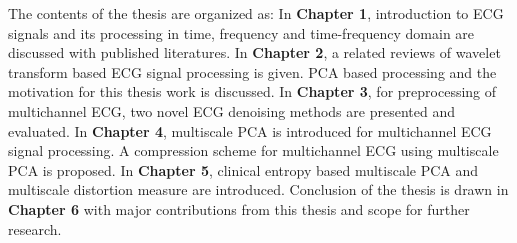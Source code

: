 \noindent The contents of the thesis are organized as: In
\textbf{Chapter 1}, introduction to ECG signals and its processing
in time, frequency and time-frequency domain are discussed with
published literatures. In \textbf{Chapter 2}, a related reviews of
wavelet transform based ECG signal processing is given. PCA based
processing and the motivation for this thesis work is discussed.
In \textbf{Chapter 3}, for preprocessing of multichannel ECG, two
novel ECG denoising methods are presented and evaluated. In
\textbf{Chapter 4}, multiscale PCA is introduced for multichannel
ECG signal processing. A compression scheme for multichannel ECG
using multiscale PCA is proposed. In \textbf{Chapter 5}, clinical
entropy based multiscale PCA and multiscale distortion measure are
introduced. Conclusion of the thesis is drawn in \textbf{Chapter
6} with major contributions from this thesis and scope for further
research.


\clearpage



